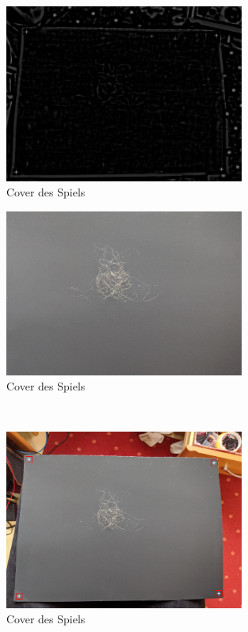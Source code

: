 \documentclass[german,a4paper,12pt,smallheadings,headsepline, titlepage, liststotoc, idextotoc,bibtoctoc,blibliography = totocnumbered]{scrartcl}
\begin{document}
\begin{figure}
	\centering
	\includegraphics[width=0.7\textwidth]{figBina/02revRes.png}
	\caption[]{Cover des Spiels}
	\label{img:Bina01}
\end{figure}
\begin{figure}
	\centering
	\includegraphics[width=0.7\textwidth]{figBina/03crop image.png}
	\caption[]{Cover des Spiels}
	\label{img:Bina01}
\end{figure}\\
\begin{figure}
	\centering
	\includegraphics[width=0.7\textwidth]{figBina/03rectImg.png}
	\caption[]{Cover des Spiels}
	\label{img:Bina01}
\end{figure}\\
\end{document}
